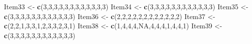 \documentclass[
  english,
]{book}
\newenvironment{Shaded}{\begin{snugshade}}{\end{snugshade}}
\newcommand{\DecValTok}[1]{\textcolor[rgb]{0.00,0.00,0.81}{#1}}
\newcommand{\KeywordTok}[1]{\textcolor[rgb]{0.13,0.29,0.53}{\textbf{#1}}}
\newcommand{\NormalTok}[1]{#1}
\newcommand{\OtherTok}[1]{\textcolor[rgb]{0.56,0.35,0.01}{#1}}
\newcommand{\StringTok}[1]{\textcolor[rgb]{0.31,0.60,0.02}{#1}}
\begin{document}
\begin{Shaded}
\begin{Highlighting}[]
\NormalTok{Item33 <-}\StringTok{ }\KeywordTok{c}\NormalTok{(}\DecValTok{3}\NormalTok{,}\DecValTok{3}\NormalTok{,}\DecValTok{3}\NormalTok{,}\DecValTok{3}\NormalTok{,}\DecValTok{3}\NormalTok{,}\DecValTok{3}\NormalTok{,}\DecValTok{3}\NormalTok{,}\DecValTok{3}\NormalTok{,}\DecValTok{3}\NormalTok{,}\DecValTok{3}\NormalTok{,}\DecValTok{3}\NormalTok{,}\DecValTok{3}\NormalTok{)}
\NormalTok{Item34 <-}\StringTok{ }\KeywordTok{c}\NormalTok{(}\DecValTok{3}\NormalTok{,}\DecValTok{3}\NormalTok{,}\DecValTok{3}\NormalTok{,}\DecValTok{3}\NormalTok{,}\DecValTok{3}\NormalTok{,}\DecValTok{3}\NormalTok{,}\DecValTok{3}\NormalTok{,}\DecValTok{3}\NormalTok{,}\DecValTok{3}\NormalTok{,}\DecValTok{3}\NormalTok{,}\DecValTok{3}\NormalTok{,}\DecValTok{3}\NormalTok{)}
\NormalTok{Item35 <-}\StringTok{ }\KeywordTok{c}\NormalTok{(}\DecValTok{3}\NormalTok{,}\DecValTok{3}\NormalTok{,}\DecValTok{3}\NormalTok{,}\DecValTok{3}\NormalTok{,}\DecValTok{3}\NormalTok{,}\DecValTok{3}\NormalTok{,}\DecValTok{3}\NormalTok{,}\DecValTok{3}\NormalTok{,}\DecValTok{3}\NormalTok{,}\DecValTok{3}\NormalTok{,}\DecValTok{3}\NormalTok{,}\DecValTok{3}\NormalTok{)}
\NormalTok{Item36 <-}\StringTok{ }\KeywordTok{c}\NormalTok{(}\DecValTok{2}\NormalTok{,}\DecValTok{2}\NormalTok{,}\DecValTok{2}\NormalTok{,}\DecValTok{2}\NormalTok{,}\DecValTok{2}\NormalTok{,}\DecValTok{2}\NormalTok{,}\DecValTok{2}\NormalTok{,}\DecValTok{2}\NormalTok{,}\DecValTok{2}\NormalTok{,}\DecValTok{2}\NormalTok{,}\DecValTok{2}\NormalTok{,}\DecValTok{2}\NormalTok{)}
\NormalTok{Item37 <-}\StringTok{ }\KeywordTok{c}\NormalTok{(}\DecValTok{2}\NormalTok{,}\DecValTok{2}\NormalTok{,}\DecValTok{1}\NormalTok{,}\DecValTok{3}\NormalTok{,}\DecValTok{3}\NormalTok{,}\DecValTok{1}\NormalTok{,}\DecValTok{2}\NormalTok{,}\DecValTok{3}\NormalTok{,}\DecValTok{3}\NormalTok{,}\DecValTok{2}\NormalTok{,}\DecValTok{3}\NormalTok{,}\DecValTok{1}\NormalTok{)}
\NormalTok{Item38 <-}\StringTok{ }\KeywordTok{c}\NormalTok{(}\DecValTok{1}\NormalTok{,}\DecValTok{4}\NormalTok{,}\DecValTok{4}\NormalTok{,}\DecValTok{4}\NormalTok{,}\OtherTok{NA}\NormalTok{,}\DecValTok{4}\NormalTok{,}\DecValTok{4}\NormalTok{,}\DecValTok{4}\NormalTok{,}\DecValTok{1}\NormalTok{,}\DecValTok{4}\NormalTok{,}\DecValTok{4}\NormalTok{,}\DecValTok{1}\NormalTok{)}
\NormalTok{Item39 <-}\StringTok{ }\KeywordTok{c}\NormalTok{(}\DecValTok{3}\NormalTok{,}\DecValTok{3}\NormalTok{,}\DecValTok{3}\NormalTok{,}\DecValTok{3}\NormalTok{,}\DecValTok{3}\NormalTok{,}\DecValTok{3}\NormalTok{,}\DecValTok{3}\NormalTok{,}\DecValTok{3}\NormalTok{,}\DecValTok{3}\NormalTok{,}\DecValTok{3}\NormalTok{,}\DecValTok{3}\NormalTok{,}\DecValTok{3}\NormalTok{)}

\end{Highlighting}
\end{Shaded}
\end{document}
